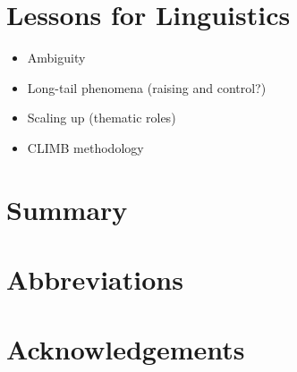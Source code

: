 \documentclass[output=paper]{langsci/langscibook}
\begin{document}
\section{Lessons for Linguistics}
\begin{itemize}
    \item Ambiguity %
    \item Long-tail phenomena (raising and control?) %
    \item Scaling up (thematic roles) %
    \item CLIMB methodology %
\end{itemize}

\section{Summary}

\section*{Abbreviations}
\section*{Acknowledgements}

\printbibliography[heading=subbibliography,notkeyword=this] 
\end{document}
